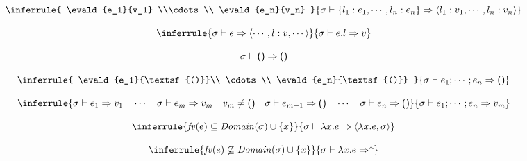 \textbf{}
\[
  \inferrule
  { \evald{e_1}{v_1} \\\cdots\\ \evald{e_n}{v_n} }
  { \evald{\{l_1:e_1,\cdots,l_n:e_n\}}{\langle l_1:v_1,\cdots,l_n:v_n\rangle} }
\]

\[
  \inferrule
  { \evald{e}{\langle\cdots,l:v,\cdots\rangle} }
  { \evald{e.l}{v} }
\]

\textbf{}
\[
  \sigma\vdash\textsf{()}\Rightarrow\textsf{()}
\]

\[
  \inferrule
  { \evald{e_1}{\textsf{()}}\\ \cdots\\ \evald{e_n}{\textsf{()}} }
  { \evald{e_1;\cdots;e_n}{\textsf{()}} }
\]

\[
  \inferrule
  {
    \evald{e_1}{v_1}\quad\cdots\quad\evald{e_m}{v_m}\quad
    v_m\not=\textsf{()}\quad
    \evald{e_{m+1}}{\textsf{()}}\quad\cdots\quad\evald{e_n}{\textsf{()}}
  }
  { \evald{e_1;\cdots;e_n}{v_m} }
\]

\textbf{}
\[
  \inferrule
  { \embox{fv}(e)\subseteq\dom{\sigma}\cup\{x\} }
  { \evald{\efun{x}{e}}{\clov{x}{e}{\sigma}} }
\]

\[
  \inferrule
  { \embox{fv}(e)\not\subseteq\dom{\sigma}\cup\{x\} }
  { \evald{\efun{x}{e}}{\uparrow} }
\]

